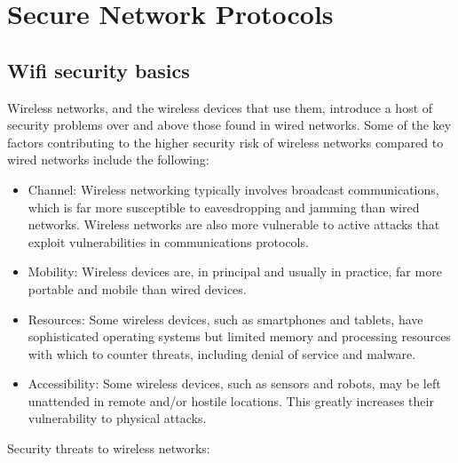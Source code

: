 \documentclass[12pt]{article}
\begin{document}
 \newpage
 \section{Secure Network Protocols}
 
 \subsection{Wifi security basics}
 Wireless networks, and the wireless devices that use them, introduce a host of  security problems over and above those found in wired networks. Some of the key factors contributing to the higher security risk of wireless networks compared to wired networks include the following:
 \begin{itemize}
 	\item Channel: Wireless networking typically involves broadcast communications, which is far more susceptible to eavesdropping and jamming than wired networks. Wireless networks are also more vulnerable to active attacks that exploit vulnerabilities in communications protocols.
 	\item Mobility: Wireless devices are, in principal and usually in practice, far more portable and mobile than wired devices.
 	\item Resources: Some wireless devices, such as smartphones and tablets, have sophisticated operating systems but limited memory and processing resources with which to counter threats, including denial of service and malware.
 	\item Accessibility: Some wireless devices, such as sensors and robots, may be left unattended in remote and/or hostile locations. This greatly increases their	vulnerability to physical attacks.
 \end{itemize}
 Security threats to wireless networks:
\end{document}
